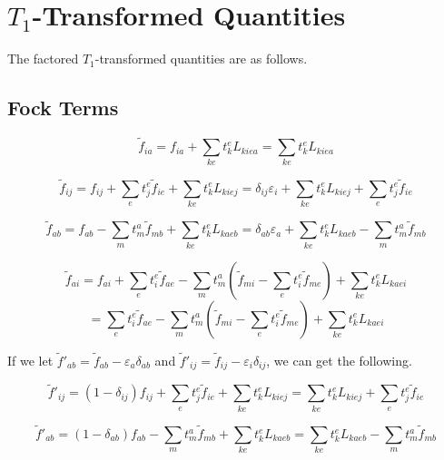 \documentclass{article}
\begin{document}
\section{$T_1$-Transformed Quantities}

The factored $T_1$-transformed quantities are as follows.

\subsection{Fock Terms}

\begin{equation}
  \tilde{f}_{ia} = f_{ia} + \sum_{ke} t_k^eL_{kiea} = \sum_{ke} t_k^e L_{kiea}
\end{equation}

\begin{equation}
  \tilde{f}_{ij} = f_{ij} + \sum_et_j^e\tilde{f}_{ie} + \sum_{ke} t_k^eL_{kiej} = \delta_{ij}\varepsilon_i +  \sum_{ke} t_k^eL_{kiej} + \sum_et_j^e\tilde{f}_{ie}
\end{equation}

\begin{equation}
  \tilde{f}_{ab} = f_{ab} - \sum_mt_m^a\tilde{f}_{mb} + \sum_{ke}t_k^eL_{kaeb} = \delta_{ab}\varepsilon_a + \sum_{ke}t_k^eL_{kaeb} - \sum_mt_m^a\tilde{f}_{mb}
\end{equation}

\begin{equation}
  \tilde{f}_{ai} = f_{ai} + \sum_et_i^e\tilde{f}_{ae} - \sum_mt_m^a\left(\tilde{f}_{mi} - \sum_et_i^e\tilde{f}_{me}\right) + \sum_{ke}t_k^eL_{kaei}
\end{equation}
\begin{equation}
  = \sum_et_i^e\tilde{f}_{ae} - \sum_mt_m^a\left(\tilde{f}_{mi} - \sum_et_i^e\tilde{f}_{me}\right) + \sum_{ke}t_k^eL_{kaei}
\end{equation}

If we let $\tilde{f}'_{ab} = \tilde{f}_{ab} - \varepsilon_a\delta_{ab}$ and $\tilde{f}'_{ij} = \tilde{f}_{ij} - \varepsilon_i\delta_{ij}$, we can get the following.

\begin{equation}
  \tilde{f}'_{ij} = (1 - \delta_{ij})f_{ij} + \sum_et_j^e\tilde{f}_{ie} + \sum_{ke} t_k^eL_{kiej} = \sum_{ke} t_k^eL_{kiej} + \sum_et_j^e\tilde{f}_{ie}
\end{equation}

\begin{equation}
  \tilde{f}'_{ab} = (1 - \delta_{ab})f_{ab} - \sum_mt_m^a\tilde{f}_{mb} + \sum_{ke}t_k^eL_{kaeb} = \sum_{ke}t_k^eL_{kaeb} - \sum_mt_m^a\tilde{f}_{mb}
\end{equation}
\end{document}
